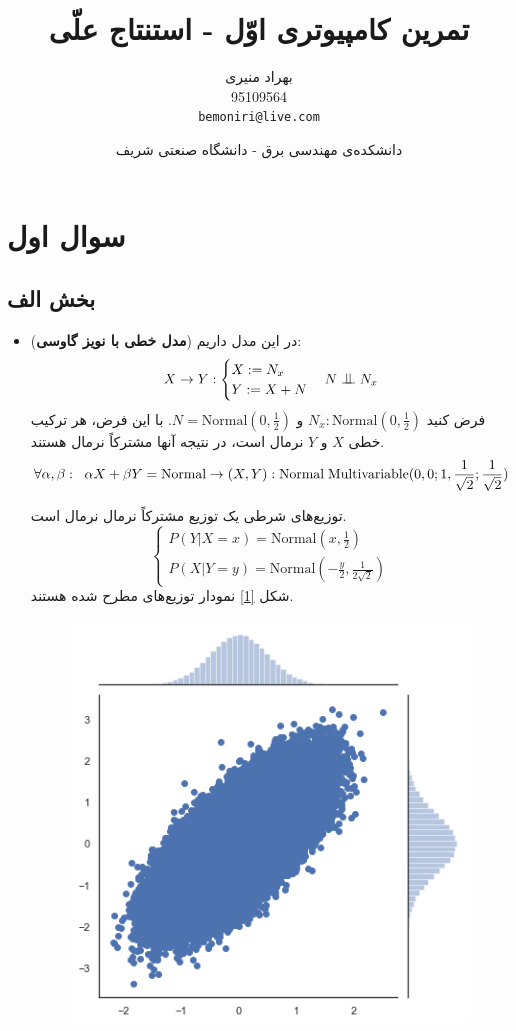 \documentclass{article}
\title{تمرین کامپیوتری اوّل - استنتاج علّی}
\author{بهراد منیری\\95109564\\ \texttt{bemoniri@live.com}}
\date{دانشکده‌ی مهندسی برق - دانشگاه صنعتی شریف}
\begin{document}
\maketitle
\section{سوال اول}
\subsection{بخش الف}	
\begin{itemize}
\item 	(\textbf{مدل خطی با نویز گاوسی})
در این مدل داریم:
$$
X \rightarrow Y :
\begin{cases}
X := N_x\\
Y := X + N 
\end{cases}
N \bigCI N_x
$$
فرض کنید
$N_x : \textrm{Normal}(0, \frac{1}{2})$
و
$ N = \textrm{Normal}(0, \frac{1}{2})$.
با این فرض، هر ترکیب خطی $X$ و $Y$ نرمال است، در نتیجه آنها مشترکاً نرمال هستند.
$$\forall \alpha, \beta: \;\;  \alpha X + \beta Y = \textrm{Normal} \rightarrow (X, Y): \textrm{Normal\;Multivariable}(0,0;1,\frac{1}{\sqrt{2}};\frac{1}{\sqrt{2}})$$

توزیع‌های شرطی یک توزیع مشترکاً نرمال نرمال است.
$$
\begin{cases}
P(Y|X=x) = \textrm{Normal}(x, \frac{1}{2})\\ 
P(X|Y=y) = \textrm{Normal}(-\frac{y}{2}, \frac{1}{2\sqrt{2}})
\end{cases}
$$
شکل
\eqref{1}
نمودار توزیع‌های مطرح شده هستند.

\begin{figure}[h!]
\centering
\includegraphics[scale=0.3]{lin_cond1.png}
\begin{floatrow}


\end{floatrow}
\end{figure}
\end{itemize}
\end{document}
